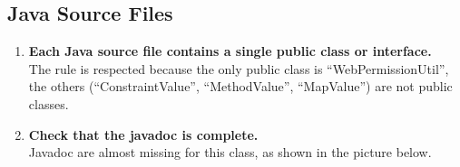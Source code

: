 \documentclass[a4paper,11pt]{report} %
\begin{document}
		\subsection*{Java Source Files}\begin{enumerate}[resume]
			\item \textbf{Each Java source file contains a single public class or interface.}\smallskip \\
				The rule is respected because the only public class is ``WebPermissionUtil'', the others (``ConstraintValue'', ``MethodValue'', ``MapValue'') are not public classes.
			\setcounter{enumi}{21}
			\setcounter{enumi}{22}
			\item \textbf{Check that the javadoc is complete.}\smallskip \\
				Javadoc are almost missing for this class, as shown in the picture below.\smallskip \\
				\begin{minipage}{\linewidth}
				\end{minipage} \linebreak
		\end{enumerate}
		
\end{document}
